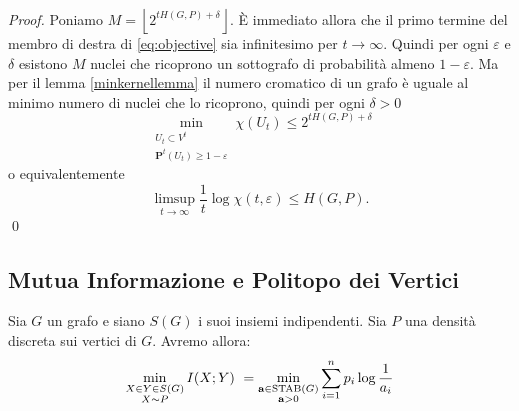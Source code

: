 \begin{proof}
	Poniamo \(M=\left\lfloor 2^{tH(G,P)+\delta}\right\rfloor\). È immediato allora che il primo termine del membro di destra di \eqref{eq:objective} sia infinitesimo per \(t\to \infty\). Quindi per ogni \(\varepsilon\) e \(\delta\) esistono \(M\) nuclei che ricoprono un sottografo di probabilità almeno \(1-\varepsilon\). Ma per il lemma \ref{minkernellemma} il numero cromatico di un grafo è uguale al minimo numero di nuclei che lo ricoprono, quindi per ogni \(\delta>0\)
	\[\min_{\substack{U_{t}\subset V^{t}\\
	\mathbf{P}^t(U_{t})\ge 1-\varepsilon}} \chi(U_{t})\le 2^{tH(G,P)+\delta}\]
	o equivalentemente
	\[\limsup_{t\to \infty}\frac{1}{t} \log{\chi({t,\varepsilon})}\le H(G,P).\]
	\qed 
\end{proof}

\subsection{Mutua Informazione e Politopo dei Vertici} 
\begin{theorem}
	[Simonyi] Sia \(G\) un grafo e siano \(S(G)\) i suoi insiemi indipendenti. Sia \(P\) una densità discreta sui vertici di \(G\). Avremo allora:
	\[\min_{\substack{X\in Y\in S(G) \\
	X\sim P}} I(X;Y)\ = \min_{\substack{\mathbf{a}\in \text{\text{STAB}}(G) \\
	\mathbf{a}>0}} \sum_{i=1}^n p_i\log{\frac{1}{a_i}}\]
\end{theorem}
